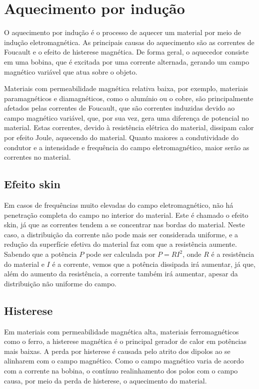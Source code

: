 \chapter{Aquecimento por indução}
O aquecimento por indução\cite{wiki-induction} é o processo de aquecer um material por meio de indução eletromagnética. As principais causas do aquecimento são as correntes de Foucault e o efeito de histerese magnética. De forma geral, o aquecedor consiste em uma bobina, que é excitada por uma corrente alternada, gerando um campo magnético variável que atua sobre o objeto.

Materiais com permeabilidade magnética relativa baixa, por exemplo, materiais paramagnéticos e diamagnéticos, como o alumínio ou o cobre, são principalmente afetados pelas correntes de Foucault, que são correntes induzidas devido ao campo magnético variável, que, por sua vez, gera uma diferença de potencial no material. Estas correntes, devido à resistência elétrica do material, dissipam calor por efeito Joule, aquecendo do material. Quanto maiores a condutividade do condutor e a intensidade e frequência do campo eletromagnético, maior serão as correntes no material.
\section{Efeito skin}
Em casos de frequências muito elevadas do campo eletromagnético, não há penetração completa do campo no interior do material. Este é chamado o efeito skin, já que as correntes tendem a se concentrar nas bordas do material. Neste caso, a distribuição da corrente não pode mais ser considerada uniforme, e a redução da superfície efetiva do material faz com que a resistência aumente. Sabendo que a potência $P$ pode ser calculada por $P = RI^2$, onde $R$ é a resistência do material e $I$ é a corrente, vemos que a potência dissipada irá aumentar, já que, além do aumento da resistência, a corrente também irá aumentar, apesar da distribuição não uniforme do campo.
\section{Histerese}
Em materiais com permeabilidade magnética alta, materiais ferromagnéticos como o ferro, a histerese magnética é o principal gerador de calor em potências mais baixas. A perda por histerese é causada pelo atrito dos dipolos ao se alinharem com o campo magnético. Como o campo magnético varia de acordo com a corrente na bobina, o contínuo realinhamento dos polos com o campo causa, por meio da perda de histerese, o aquecimento do material.